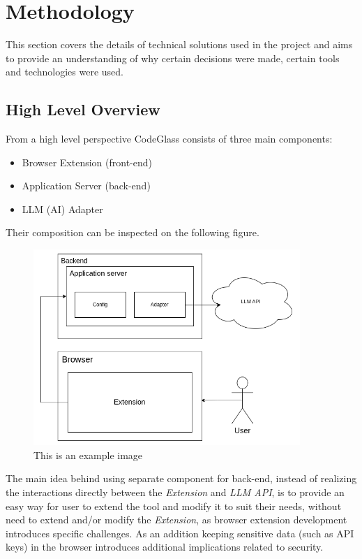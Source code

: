 \section{Methodology}

This section covers the details of technical solutions used in the project and
aims to provide an understanding of why certain decisions were made, certain
tools and technologies were used.

\subsection{High Level Overview}

From a high level perspective CodeGlass consists of three main components:

\begin{itemize}
    \item Browser Extension (front-end)
    \item Application Server (back-end)
    \item LLM (AI) Adapter
\end{itemize}

Their composition can be inspected on the following figure.

\begin{figure}[h]
    \centering
    \includegraphics[width=0.9\textwidth]{assets/hl-arch.png}
    \caption{This is an example image}
    \label{fig:hl}
\end{figure}

The main idea behind using separate component for back-end, instead of realizing
the interactions directly between the \emph{Extension} and \emph{LLM API}, is to
provide an easy way for user to extend the tool and modify it to suit their needs,
without need to extend and/or modify the \emph{Extension}, as browser extension
development introduces specific challenges. As an addition keeping sensitive data
(such as API keys) in the browser introduces additional implications related to
security.

